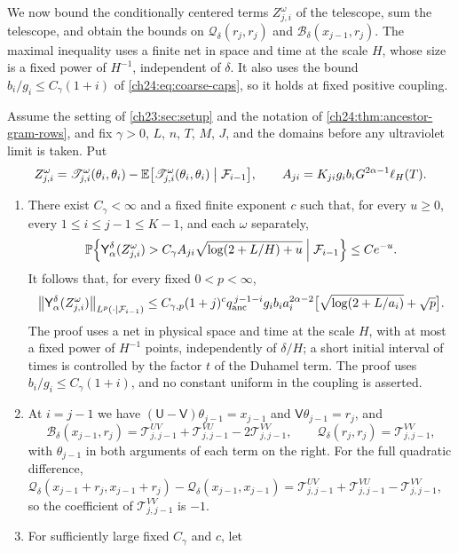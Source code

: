 We now bound the conditionally centered terms $Z^\omega_{j,i}$ of the telescope, sum the telescope, and obtain the bounds on $\mathcal Q_\delta(r_j,r_j)$ and $\mathcal B_\delta(x_{j-1},r_j)$. The maximal inequality uses a finite net in space and time at the scale $H$, whose size is a fixed power of $H^{-1}$, independent of $\delta$. It also uses the bound $b_i/g_i\le C_\gamma(1+i)$ of \eqref{ch24:eq:coarse-caps}, so it holds at fixed positive coupling.

\begin{theorem}\label{ch24:thm:ordered-rough-return}
Assume the setting of \cref{ch23:sec:setup} and the notation of \cref{ch24:thm:ancestor-gram-rows}, and fix $\gamma>0$, $L$, $n$, $T$, $M$, $J$, and the domains before any ultraviolet limit is taken. Put
\[
 Z_{j,i}^\omega=\mathscr T_{j,i}^\omega(\theta_i,\theta_i)-\mathbb E\bigl[\mathscr T_{j,i}^\omega(\theta_i,\theta_i)\bigm|\mathcal F_{i-1}\bigr],\qquad
 A_{ji}=K_{ji}g_ib_iG^{2\alpha-1}\ell_H(T).
\]
\begin{enumerate}
\item There exist $C_\gamma<\infty$ and a fixed finite exponent $c$ such that, for every $u\ge0$, every $1\le i\le j-1\le K-1$, and each $\omega$ separately,
\[
 \mathbb P\Bigl\{\mathsf Y_{\alpha}^{\delta}(Z_{j,i}^\omega)>C_\gamma A_{ji}\sqrt{\log(2+L/H)+u}\Bigm|\mathcal F_{i-1}\Bigr\}\le Ce^{-u}.
\]
It follows that, for every fixed $0<p<\infty$,
\[
 \bigl\|\mathsf Y_{\alpha}^{\delta}(Z_{j,i}^\omega)\bigr\|_{L^p(\cdot\mid\mathcal F_{i-1})}\le C_{\gamma,p}(1+j)^cq_{\mathrm{anc}}^{\,j-1-i}g_ib_ia_i^{2\alpha-2}\bigl[\sqrt{\log(2+L/a_i)}+\sqrt p\bigr].
\]
The proof uses a net in physical space and time at the scale $H$, with at most a fixed power of $H^{-1}$ points, independently of $\delta/H$; a short initial interval of times is controlled by the factor $t$ of the Duhamel term. The proof uses $b_i/g_i\le C_\gamma(1+i)$, and no constant uniform in the coupling is asserted.
\item At $i=j-1$ we have $(\mathsf U-\mathsf V)\theta_{j-1}=x_{j-1}$ and $\mathsf V\theta_{j-1}=r_j$, and
\[
 \mathcal B_\delta(x_{j-1},r_j)=\mathscr T_{j,j-1}^{UV}+\mathscr T_{j,j-1}^{VU}-2\mathscr T_{j,j-1}^{VV},\qquad
 \mathcal Q_\delta(r_j,r_j)=\mathscr T_{j,j-1}^{VV},
\]
with $\theta_{j-1}$ in both arguments of each term on the right. For the full quadratic difference, $\mathcal Q_\delta(x_{j-1}+r_j,x_{j-1}+r_j)-\mathcal Q_\delta(x_{j-1},x_{j-1})=\mathscr T_{j,j-1}^{UV}+\mathscr T_{j,j-1}^{VU}-\mathscr T_{j,j-1}^{VV}$, so the coefficient of $\mathscr T^{VV}_{j,j-1}$ is $-1$.
\item For sufficiently large fixed $C_\gamma$ and $c$, let

\end{enumerate}
\end{theorem}
